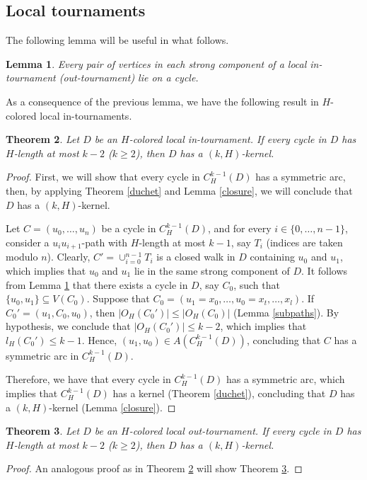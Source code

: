 \documentclass[10pt,a4paper]{article}
\newtheorem{theorem}{Theorem}[section]
\newtheorem{lemma}[theorem]{Lemma}
\begin{document}
\subsection{Local tournaments}

The following lemma will be useful in what follows.

\begin{lemma}\cite{localtour}
\label{localintour}
Every pair of vertices in each strong component of a local in-tournament (out-tournament) lie on a cycle.
\end{lemma}

As a consequence of the previous lemma, we have the following result in $H$-colored local in-tournaments.

\begin{theorem}
\label{localin}
Let $D$ be an $H$-colored local in-tournament. If every cycle in $D$ has $H$-length at most $k-2$ ($k \geq 2$), then $D$ has a $(k,H)$-kernel. 
\end{theorem}
\begin{proof}
First, we will show that every cycle in $C_{H}^{k-1}(D)$ has a symmetric arc, then, by applying Theorem \ref{duchet} and Lemma \ref{closure}, we will conclude that $D$ has a $(k,H)$-kernel. 

Let $C=(u_{0}, \ldots , u_{n})$ be a cycle in $C_{H}^{k-1}(D)$, and for every $i \in \{0, \ldots , n-1 \}$, consider a $u_{i}u_{i+1}$-path with $H$-length at most $k-1$, say $T_{i}$ (indices are taken modulo $n$). Clearly, $C'=\cup _{i=0}^{n-1} T_{i}$ is a closed walk in $D$ containing $u_{0}$ and $u_{1}$, which implies that $u_{0}$ and $u_{1}$ lie in the same strong component of $D$. It follows from Lemma \ref{localintour} that there exists a cycle in $D$, say $C_{0}$, such that $\{ u_{0}, u_{1} \} \subseteq V(C_{0})$. Suppose that $C_{0} =(u_{1} = x_{0}, \ldots, u_{0}=x_{t} , \ldots , x_{l} )$. If  $C_{0} ' =(u_{1}, C_{0}, u_{0})$, then $|O_{H}(C_{0}')| \leq |O_{H}(C_{0})|$ (Lemma \ref{subpaths}). By hypothesis, we conclude that $|O_{H}(C_{0}')| \leq k-2$, which implies that $l_{H}(C_{0}') \leq k-1$. Hence, $(u_{1}, u_{0}) \in A(C_{H}^{k-1}(D))$, concluding that $C$ has a symmetric arc in $C_{H}^{k-1}(D)$. 

Therefore, we have that every cycle in $C_{H}^{k-1}(D)$ has a symmetric arc, which implies that $C_{H}^{k-1}(D)$ has a kernel (Theorem \ref{duchet}), concluding that $D$ has a $(k,H)$-kernel (Lemma \ref{closure}).
\end{proof}

\begin{theorem}
\label{localout}
Let $D$ be an $H$-colored local out-tournament. If every cycle in $D$ has $H$-length at most $k-2$ ($k \geq 2$), then $D$ has a $(k,H)$-kernel. 
\end{theorem}
\begin{proof}
An analogous proof as in Theorem \ref{localin} will show Theorem \ref{localout}.
\end{proof}
\end{document}
